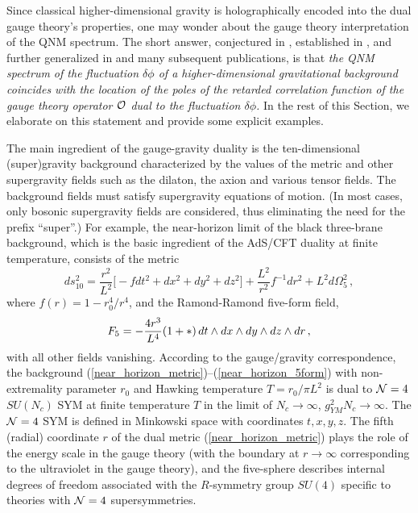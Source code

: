 \documentclass[]{iopart}
\begin{document}
Since classical higher-dimensional gravity is holographically encoded into the
dual gauge theory's properties, one may wonder about the gauge theory
interpretation of the QNM spectrum. The short answer, conjectured in
\cite{Birmingham:2001pj}, established in \cite{Son:2002sd}, and further
generalized in \cite{Kovtun:2005ev} and many subsequent publications, is that
{\it the QNM spectrum of the fluctuation $\delta \phi$ of a higher-dimensional
  gravitational background coincides with the location of the poles of the
  retarded correlation function of the gauge theory operator ${\cal O}$ dual
  to the fluctuation $\delta \phi$.}  In the rest of this Section, we
elaborate on this statement and provide some explicit examples.

The main ingredient of the gauge-gravity duality is the ten-dimensional
(super)gravity background characterized by the values of the metric and other
supergravity fields such as the dilaton, the axion and various tensor
fields. The background fields must satisfy supergravity equations of
motion. (In most cases, only bosonic supergravity fields are considered, thus
eliminating the need for the prefix ``super''.)
%
For example, the near-horizon limit of the black three-brane background, which
is the basic ingredient of the AdS/CFT duality at finite temperature, consists
of the metric
%
\begin{equation}\label{near_horizon_metric}
  ds^2_{10} = \frac{r^2}{L^2} \Biggl[ -f dt^2 + dx^2 + dy^2 +dz^2 \Biggr]
+ \frac{L^2}{r^2} f^{-1}dr^2 + L^2 d\Omega_5^2\,,
\end{equation}
%
where $f(r) = 1- r_0^4/r^4$, and the Ramond-Ramond five-form field,
%
\begin{equation}
F_5 = - {4 r^3\over L^4} (1 + * )\,
 d t\wedge d x \wedge d y
 \wedge d z  \wedge d r\,,
\label{near_horizon_5form}
\end{equation}
%
with all other fields vanishing.
%
According to the gauge/gravity correspondence, the background
(\ref{near_horizon_metric})--(\ref{near_horizon_5form}) with non-extremality
parameter $r_0$ and Hawking temperature $T = r_0/\pi L^2$ is dual to ${\cal
  N}=4$ $SU(N_c)$ SYM at finite temperature $T$ in the limit of
$N_c\rightarrow \infty$, $g^2_{YM}N_c \rightarrow \infty$.
%
The ${\cal N}=4$ SYM is defined in Minkowski space with coordinates $t,x,y,z$.
The fifth (radial) coordinate $r$ of the dual metric
(\ref{near_horizon_metric}) plays the role of the energy scale in the gauge
theory (with the boundary at $r\rightarrow \infty$ corresponding to the ultraviolet in
the gauge theory), and the five-sphere describes internal degrees of freedom
associated with the $R$-symmetry group $SU(4)$ specific to theories with
${\cal N} = 4$ supersymmetries.
%
\end{document}
